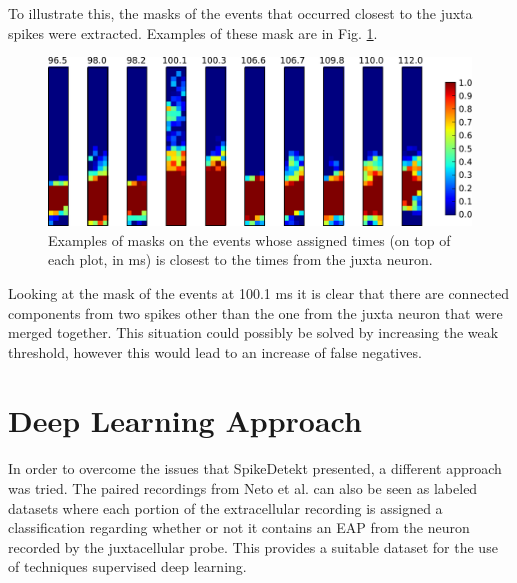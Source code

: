 \documentclass[10pt]{article}
\begin{document}
To illustrate this, the masks of the events that occurred closest to the juxta spikes were extracted. Examples of these mask are in Fig. \ref{fig:masks-examples}.
 
\begin{figure}[!htb]
\captionsetup{font=small}

	\centering
	\includegraphics[width=\linewidth]{2.Chapter/masks-939-ready-summary.pdf}
	\caption{Examples of masks on the events whose assigned times (on top of each plot, in ms) is closest to the times from the juxta neuron.
}
\label{fig:masks-examples}
\end{figure}


Looking at the mask of the events at 100.1 ms it is clear that there are connected components from two spikes other than the one from the juxta neuron that were merged together. This situation could possibly be solved by increasing the weak threshold, however this would lead to an increase of false negatives. 


\section{Deep Learning Approach}
In order to overcome the issues that SpikeDetekt presented, a different approach was tried. The paired recordings from Neto et al. can also be seen as labeled datasets where each portion of the extracellular recording is assigned a classification regarding whether or not it contains an EAP from the neuron recorded by the juxtacellular probe. This provides a suitable dataset for the use of techniques supervised deep learning. 
\end{document}
